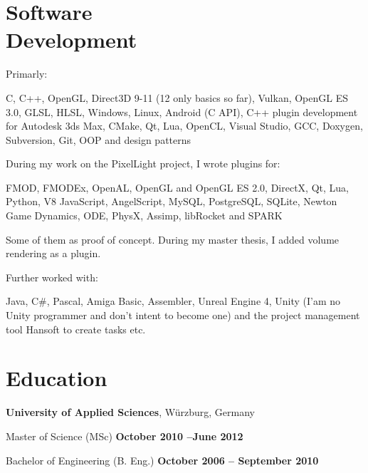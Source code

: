 \documentclass[margin,line]{Ofenberg_Resume}
\begin{document}
\begin{resume}
	\section{\mysidestyle Software\\Development}

	Primarly:
	\begin{list2}
		\item C, C++, OpenGL, Direct3D 9-11 (12 only basics so far), Vulkan, OpenGL ES 3.0, GLSL, HLSL, Windows, Linux, Android (C API), C++ plugin development for Autodesk 3ds Max, CMake, Qt, Lua, OpenCL, Visual Studio, GCC, Doxygen, Subversion, Git, OOP and design patterns
	\end{list2}\vspace{-1.5mm}

	During my work on the PixelLight project, I wrote plugins for:
	\begin{list2}
		\item FMOD, FMODEx, OpenAL, OpenGL and OpenGL ES 2.0, DirectX,
		Qt, Lua, Python, V8 JavaScript, AngelScript, MySQL, PostgreSQL, SQLite, Newton Game Dynamics, ODE, PhysX, Assimp, libRocket and SPARK
	\end{list2}\vspace{-1.5mm}
	Some of them as proof of concept. During my master thesis, I added volume rendering as a plugin.

	Further worked with:
	\begin{list2}
		\item Java, C\#, Pascal, Amiga Basic, Assembler, Unreal Engine 4, Unity (I'am no Unity programmer and don't intent to become one) and the project management tool Hansoft to create tasks etc.
	\end{list2}\vspace{-1.5mm}


	\section{\mysidestyle Education}
	\textbf{University of Applied Sciences}, W\"urzburg, Germany
	\begin{list2}
		\item Master of Science (MSc) \hfill \textbf{October 2010 --June 2012}\vspace{-3mm}\\\vspace{-1mm}%
		\item Bachelor of Engineering (B. Eng.) \hfill \textbf{October 2006 -- September 2010}\vspace{-3mm}\\\vspace{-1mm}%
	\end{list2}\vspace{-1.5mm}



\end{resume}
\end{document}
